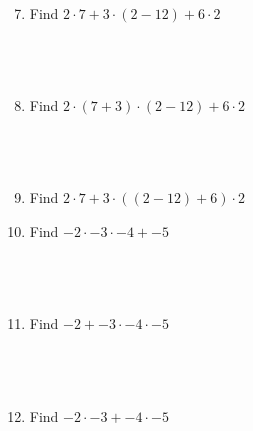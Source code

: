 \documentclass{article}
\begin{document}
\noindent
\vspace{2cm}
\\
\begin{minipage}[t]{0.45\textwidth}
    \begin{enumerate}
        \setcounter{enumi}{6}
        \item Find $2 \cdot 7 + 3 \cdot (2-12) + 6 \cdot 2$
        \\\\\\\\
        \item Find $2 \cdot (7 + 3) \cdot (2-12) + 6 \cdot 2$
        \\\\\\\\
        \item Find $2 \cdot 7 + 3 \cdot ((2-12) + 6) \cdot 2$
    \end{enumerate}
\end{minipage}%
\hfill
\begin{minipage}[t]{0.45\textwidth}
    \begin{enumerate}
        \setcounter{enumi}{9} %
        \item Find $-2 \cdot -3 \cdot -4 + -5 $
        \\\\\\\\
        \item Find $-2 + -3 \cdot -4 \cdot -5 $
        \\\\\\\\
        \item Find $-2 \cdot -3 + -4 \cdot -5 $

    \end{enumerate}
\end{minipage}
\end{document}
